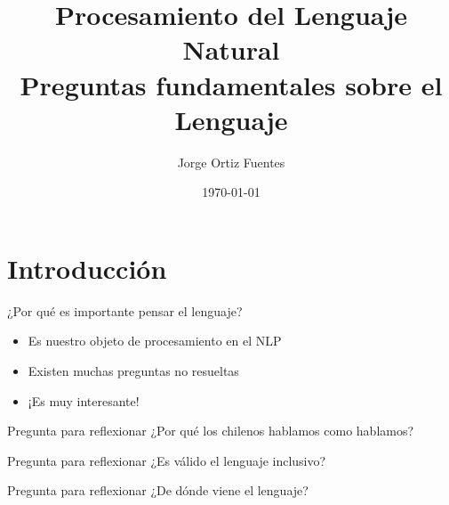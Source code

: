 \documentclass[handout]{beamer}
\title{Procesamiento del Lenguaje Natural \\ \large Preguntas fundamentales sobre el Lenguaje}
\author[Jorge Ortiz Fuentes]{Jorge Ortiz Fuentes}
\date{\today}
\begin{document}
\begin{frame}
  \titlepage
\end{frame}


\section{Introducción}

\begin{frame}{¿Por qué es importante pensar el lenguaje?}
  \begin{itemize}
    \item Es nuestro objeto de procesamiento en el NLP
    \item Existen muchas preguntas no resueltas
    \item ¡Es muy interesante!
  \end{itemize}
\end{frame}


\begin{frame}{Pregunta para reflexionar}
  \centering
  \LARGE ¿Por qué los chilenos hablamos como hablamos?
\end{frame}

\begin{frame}{Pregunta para reflexionar}
  \centering
  \LARGE ¿Es válido el lenguaje inclusivo?
\end{frame}

\begin{frame}{Pregunta para reflexionar}
  \centering
  \LARGE ¿De dónde viene el lenguaje?
\end{frame}
\end{document}
